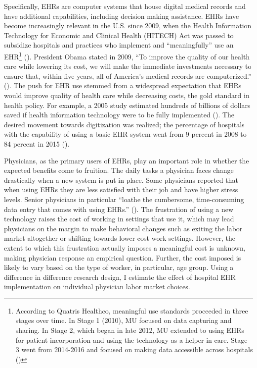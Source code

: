 \documentclass[12pt]{article}
\begin{document}
Specifically, EHRs are computer systems that house digital medical records and have additional capabilities, including decision making assistance. EHRs have become increasingly relevant in the U.S. since 2009, when the Health Information Technology for Economic and Clinical Health (HITECH) Act was passed to subsidize hospitals and practices who implement and ``meaningfully'' use an EHR\footnote{According to Quatris Healthco, meaningful use standards proceeded in three stages over time. In Stage 1 (2010), MU focused on data capturing and sharing. In Stage 2, which began in late 2012, MU extended to using EHRs for patient incorporation and using the technology as a helper in care. Stage 3 went from 2014-2016 and focused on making data accessible across hospitals (\cite{meanuse})} (\cite{hitech}). President Obama stated in 2009, “To improve the quality of our health care while lowering its cost, we will make the immediate investments necessary to ensure that, within five years, all of America’s medical records are computerized.” (\cite{presquote}). The push for EHR use stemmed from a widespread expectation that EHRs would improve quality of health care while decreasing costs, the gold standard in health policy. For example, a 2005 study estimated hundreds of billions of dollars saved if health information technology were to be fully implemented (\cite{hillestad2005}). The desired movement towards digitization was realized; the percentage of hospitals with the capability of using a basic EHR system went from 9 percent in 2008 to 84 percent in 2015 (\cite{stats}).

Physicians, as the primary users of EHRs, play an important role in whether the expected benefits come to fruition. The daily tasks a physician faces change drastically when a new system is put in place. Some physicians reported that when using EHRs they are less satisfied with their job and have higher stress levels. Senior physicians in particular “loathe the cumbersome, time-consuming data entry that comes with using EHRs.” (\cite{CollierBurnout}). The frustration of using a new technology raises the cost of working in settings that use it, which may lead physicians on the margin to make behavioral changes such as exiting the labor market altogether or shifting towards lower cost work settings. However, the extent to which this frustration actually imposes a meaningful cost is unknown, making physician response an empirical question. Further, the cost imposed is likely to vary based on the type of worker, in particular, age group. Using a difference in difference research design, I estimate the effect of hospital EHR implementation on individual physician labor market choices.
\end{document}

